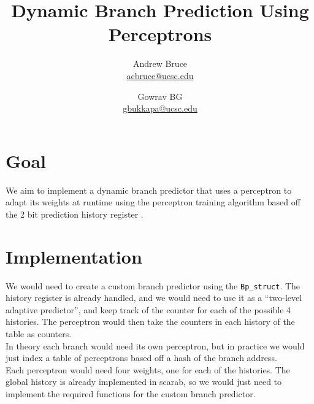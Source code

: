 \documentclass{article}
\title{Dynamic Branch Prediction Using Perceptrons}
\author{Andrew Bruce \\ \href{mailto:acbruce@ucsc.edu}{acbruce@ucsc.edu}
  \and Gowrav BG \\ \href{mailto:gbukkapa@ucsc.edu}{gbukkapa@ucsc.edu} }
\begin{document}
\maketitle
{}
\section*{Goal}
We aim to implement a dynamic branch predictor that uses a perceptron to adapt its weights at runtime using the perceptron training algorithm based off the 2 bit prediction history register \cite{article}.
\section*{Implementation}
We would need to create a custom branch predictor using the \verb=Bp_struct=. The history register is already handled, and we would need to use it as a ``two-level adaptive predictor'', and keep track of the counter for each of the possible 4 histories. The perceptron would then take the counters in each history of the table as counters.\\
In theory each branch would need its own perceptron, but in practice we would just index a table of perceptrons based off a hash of the branch address.\\
Each perceptron would need four weights, one for each of the histories. The global history is already implemented in scarab, so we would just need to implement the required functions for the custom branch predictor.


\end{document}
